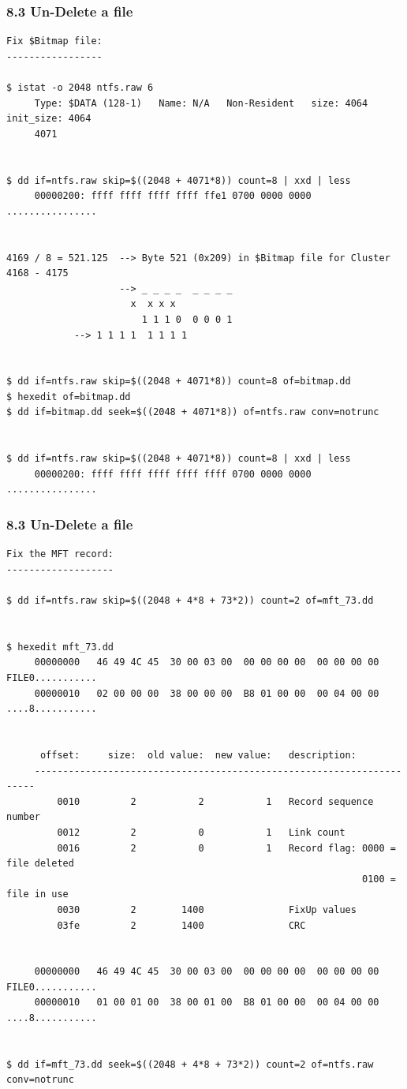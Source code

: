 \begin{frame}[fragile]
  \frametitle{8.3 Un-Delete a file}
  \begin{lstlisting}[basicstyle=\tiny]
Fix $Bitmap file:
-----------------

$ istat -o 2048 ntfs.raw 6
     Type: $DATA (128-1)   Name: N/A   Non-Resident   size: 4064  init_size: 4064
     4071


$ dd if=ntfs.raw skip=$((2048 + 4071*8)) count=8 | xxd | less
     00000200: ffff ffff ffff ffff ffe1 0700 0000 0000  ................


4169 / 8 = 521.125  --> Byte 521 (0x209) in $Bitmap file for Cluster 4168 - 4175
                    --> _ _ _ _  _ _ _ _
		              x  x x x   
                        1 1 1 0  0 0 0 1
		    --> 1 1 1 1  1 1 1 1


$ dd if=ntfs.raw skip=$((2048 + 4071*8)) count=8 of=bitmap.dd
$ hexedit of=bitmap.dd
$ dd if=bitmap.dd seek=$((2048 + 4071*8)) of=ntfs.raw conv=notrunc


$ dd if=ntfs.raw skip=$((2048 + 4071*8)) count=8 | xxd | less
     00000200: ffff ffff ffff ffff ffff 0700 0000 0000  ................
  \end{lstlisting}
\end{frame}


\begin{frame}[fragile]
  \frametitle{8.3 Un-Delete a file}
  \begin{lstlisting}[basicstyle=\tiny]
Fix the MFT record:
-------------------

$ dd if=ntfs.raw skip=$((2048 + 4*8 + 73*2)) count=2 of=mft_73.dd


$ hexedit mft_73.dd
     00000000   46 49 4C 45  30 00 03 00  00 00 00 00  00 00 00 00  FILE0...........
     00000010   02 00 00 00  38 00 00 00  B8 01 00 00  00 04 00 00  ....8...........


      offset:     size:  old value:  new value:   description:
     ----------------------------------------------------------------------
         0010         2           2           1   Record sequence number
         0012         2           0           1   Link count
         0016         2           0           1   Record flag: 0000 = file deleted
                                                               0100 = file in use
         0030         2        1400               FixUp values
         03fe         2        1400               CRC


     00000000   46 49 4C 45  30 00 03 00  00 00 00 00  00 00 00 00  FILE0...........
     00000010   01 00 01 00  38 00 01 00  B8 01 00 00  00 04 00 00  ....8...........


$ dd if=mft_73.dd seek=$((2048 + 4*8 + 73*2)) count=2 of=ntfs.raw conv=notrunc
  \end{lstlisting}
\end{frame}


